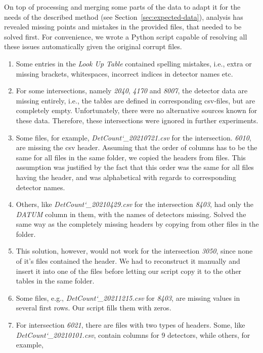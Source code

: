 On top of processing and merging some parts of the data to adapt it for the
needs of the described method (see Section~\ref{sec:expected-data}), analysis 
has revealed missing points and mistakes in the provided files, that needed to 
be solved first. For convenience, we wrote a Python script capable of resolving
all these issues automatically given the original corrupt files.

\begin{enumerate}
	\item Some entries in the \textit{Look Up Table} contained spelling
	mistakes, i.e., extra or missing brackets, whitespaces, incorrect indices in
	detector names etc.
	\item For some intersections, namely \textit{2040}, \textit{4170} and 
	\textit{8007}, the detector data are missing entirely, i.e.,
	the tables are defined in corresponding csv-files, but are completely empty.
	Unfortunately, there were no alternative sources known for these data.
	Therefore, these intersections were ignored in further experiments.
	\item Some files, for example, \textit{DetCount\char`_20210721.csv} for the 
	intersection.
	\textit{6010}, are missing the csv header. Assuming that the order of 
	columns has to be the same for all files in the same folder, we
	copied the headers from files. This assumption was justified by the fact
	that this order was the same for all files having the header, and was
	alphabetical with regards to corresponding detector names.
	\item Others, like \textit{DetCount\char`_20210429.csv} for the intersection
	\textit{8403}, had only the \textit{DATUM} column in them, with the names of
	detectors missing. Solved the same way as the completely missing headers
	by copying from other files in the folder.
	\item This solution, however, would not work for the intersection
	\textit{3050}, since none of it's files contained the header. We had to
	reconstruct it manually and insert it into one of the files before letting
	our script copy it to the other tables in the same folder.
	\item Some files, e.g., \textit{DetCount\char`_20211215.csv} for
	\textit{8403}, are missing values in several first rows. Our script fills
	them with zeros.
	\item For intersection \textit{6021}, there are files with two types of
	headers. Some, like \textit{DetCount\char`_20210101.csv}, contain columns
	for 9 detectors, while others, for example,

\end{enumerate}
